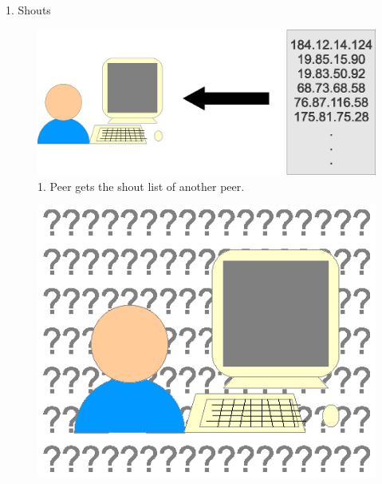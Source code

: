 \documentclass[ %
                    author={Luke Murray},
                supervisor={Dr. Simon Hollis},
                     title={Shadow Peer-to-Peer Networks},
                  subtitle={},
                    degree={MEng},
                      year={2013} ]{poster}
\begin{document}
\begin{frame}{}
\begin{columns}[t]
    \begin{column}{0.422\linewidth}
    \begin{block}{\normalsize 1. Shouts}
    \begin{figure}[h]
        \includegraphics{diagrams/poster_get_list.eps}
        \caption{1. Peer gets the shout list of another peer.}
    \end{figure}
    \begin{figure}[h]
        \includegraphics{diagrams/poster_spoof_IP.eps}

\end{figure}
\end{block}
\end{column}
\end{columns}
\end{frame}
\end{document}
